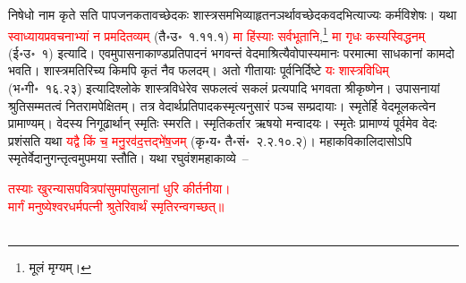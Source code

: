 \begin{sloppypar}\justifying\noindent\hspace{10mm} निषेधो नाम कृते सति पापजनकतावच्छेदकः शास्त्र\-समभिव्याहृत\-नञर्थावच्छेदक\-वदभित्याज्यः कर्म\-विशेषः। यथा \textcolor{red}{स्वाध्याय\-प्रवचनाभ्यां न प्रमदितव्यम्} (तै॰उ॰~१.११.१) \textcolor{red}{मा हिंस्याः सर्वभूतानि},\footnote{मूलं मृग्यम्।} \textcolor{red}{मा गृधः कस्य\-स्विद्धनम्} (ई॰उ॰~१) इत्यादि। एवमुपासना\-काण्ड\-प्रतिपादनं भगवन्तं वेदमाश्रित्यैवोपास्यमानः परमात्मा साधकानां कामदो भवति। शास्त्रमतिरिच्य किमपि 
कृतं नैव फलदम्। अतो गीतायाः पूर्व\-निर्दिष्टे \textcolor{red}{यः शास्त्रविधिम्} (भ॰गी॰~१६.२३) इत्यादि\-श्लोके शास्त्र\-विधेरेव सफलत्वं सकलं प्रत्यपादि भगवता श्रीकृष्णेन। उपासनायां श्रुति\-सम्मतत्वं नितरामपेक्षितम्। तत्र वेदार्थ\-प्रतिपादक\-स्मृत्यनुसारं पञ्च सम्प्रदायाः। स्मृतेर्हि वेद\-मूलकत्वेन प्रामाण्यम्। वेदस्य निगूढार्थान् स्मृतिः स्मरति। स्मृति\-कर्तार ऋषयो मन्वादयः। स्मृतेः प्रामाण्यं पूर्वमेव वेदः प्रशंसति यथा \textcolor{red}{यद्वै किं च॒ मनु॒रव॑द॒त्तद्भे॑ष॒जम्} (कृ॰य॰ तै॰सं॰~२.२.१०.२)। महाकवि\-कालिदासोऽपि स्मृतेर्वेदानु\-गन्तृत्वमुपमया स्तौति। यथा रघुवंश\-महाकाव्ये~–\end{sloppypar}
\centering\textcolor{red}{तस्याः खुरन्यासपवित्रपांसुमपांसुलानां धुरि कीर्तनीया। \nopagebreak\\
मार्गं मनुष्येश्वरधर्मपत्नी श्रुतेरिवार्थं स्मृतिरन्वगच्छत्॥}\nopagebreak\\
\\
